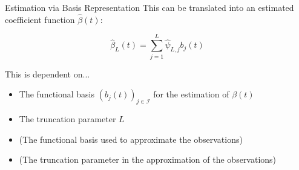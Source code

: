 \documentclass{beamer}
\begin{document}
	\begin{frame}{Estimation via Basis Representation}
		This can be translated into an estimated coefficient function $\hat{\beta}(t)$:
		
		$$\hat{\beta}_L(t) = \sum_{j = 1}^{L} \hat{\psi}_{L,j} b_j(t)$$
		\vspace{0.2cm}
	
		This is dependent on...
		\begin{itemize}
			\item The functional basis $(b_j(t))_{j \in \mathcal{I}}$ for the estimation of $\beta(t)$
			\item The truncation parameter $L$
			\item (The functional basis used to approximate the observations)
			\item (The truncation parameter in the approximation of the observations)
		\end{itemize}
	\end{frame}
	
\end{document}
